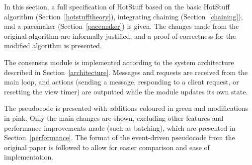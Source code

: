 In this section, a full specification of HotStuff based on the basic HotStuff algorithm (Section~\ref{hotstufftheory}), integrating chaining (Section~\ref{chaining}), and a pacemaker (Section~\ref{pacemaker}) is given. The changes made from the original algorithm are informally justified, and a proof of correctness for the modified algorithm is presented.

The consensus module is implemented according to the system architecture described in Section~\ref{architecture}. Messages and requests are received from the main loop, and actions (sending a message, responding to a client request, or resetting the view timer) are outputted while the module updates its own state.

The pseudocode is presented with additions coloured in green and modifications in pink. Only the main changes are shown, excluding other features and performance improvements made (such as batching), which are presented in Section~\ref{performance}. The format of the event-driven pseudocode from the original paper is followed to allow for easier comparison and ease of implementation.

